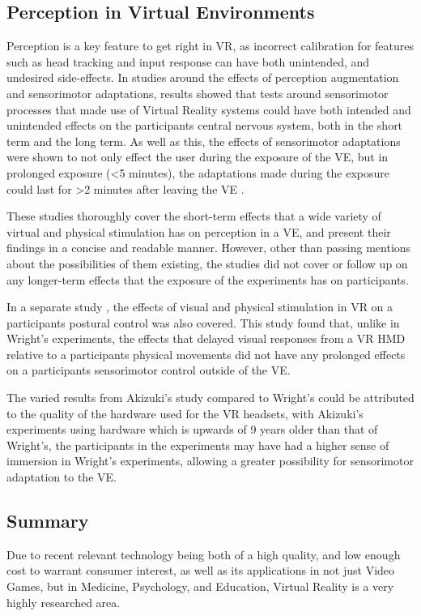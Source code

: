 		\subsection{Perception in Virtual Environments}
		\label{lr:vr:perception}
			Perception is a key feature to get right in VR, as incorrect calibration for features such as head tracking and input response can have both unintended, and undesired side-effects. In studies \cite{Wright2006}  \cite{Wright2009} \cite{Wright2011} \cite{Wright2013} \cite{Wright2014} around the effects of perception augmentation and sensorimotor adaptations, results showed that tests around sensorimotor processes that made use of Virtual Reality systems could have both intended and unintended effects on the participants central nervous system, both in the short term and the long term.
			As well as this, the effects of sensorimotor adaptations were shown to not only effect the user during the exposure of the VE, but in prolonged exposure (<5 minutes), the adaptations made during the exposure could last for >2 minutes after leaving the VE \cite{Wright2013}.

			These studies thoroughly cover the short-term effects that a wide variety of virtual and physical stimulation has on perception in a VE, and present their findings in a concise and readable manner.
			However, other than passing mentions about the possibilities of them existing, the studies did not cover or follow up on any longer-term effects that the exposure of the experiments has on participants.

			In a separate study \cite{Akizuki2005}, the effects of visual and physical stimulation in VR on a participants postural control was also covered.
			This study found that, unlike in Wright's experiments, the effects that delayed visual responses from a VR HMD relative to a participants physical movements did not have any prolonged effects on a participants sensorimotor control outside of the VE.

			The varied results from Akizuki's study compared to Wright's could be attributed to the quality of the hardware used for the VR headsets, with Akizuki's experiments using hardware which is upwards of 9 years older than that of Wright's, the participants in the experiments may have had a higher sense of immersion in Wright's experiments, allowing a greater possibility for sensorimotor adaptation to the VE.

		\subsection{Summary}
		\label{lr:vr:conclusion}
			Due to recent relevant technology being both of a high quality, and low enough cost to warrant consumer interest, as well as its applications in not just Video Games, but in Medicine, Psychology, and Education, Virtual Reality is a very highly researched area.


